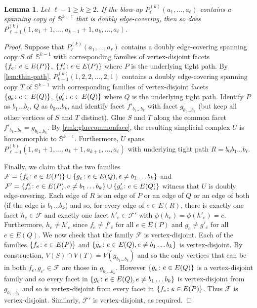 \documentclass[12pt,reqno]{amsart}
\theoremstyle{plain}
\newtheorem{lemma}[theorem]{Lemma}
\theoremstyle{definition}
\numberwithin{equation}{section}
\DeclarePairedDelimiter{\set}{\{}{\}}
\renewcommand{\geq}{\geqslant}
\newcommand{\bS}{\mathbb{S}}
\newcommand{\cF}{\mathcal{F}}
\begin{document}
	\begin{lemma}\label{lem:growing-path}
		Let $\ell - 1 \geq k \geq 2$.
		If the blow-up  $P_\ell^{(k)}(a_1, \dotsc, a_\ell)$ contains a spanning copy of~$\bS^{k - 1}$ that is doubly edge-covering, then so does $P_{\ell + 1}^{(k)}(1, a_1 + 1, \dotsc, a_{k - 1} + 1, a_k, \dotsc, a_\ell)$.
	\end{lemma}
	\begin{proof}
		Suppose that $P_\ell^{(k)}(a_1, \dotsc, a_\ell)$ contains a doubly edge-covering spanning copy $S$ of~$\bS^{k - 1}$ with corresponding families of vertex-disjoint facets $\set{f_e \colon e \in E(P)}$, $\set{f'_e \colon e \in E(P)}$ where $P$ is the underlying tight path. By \cref{lem:thin-path}, $P_{k + 1}^{(k)}(1, 2, 2, \dotsc, 2, 1)$ contains a doubly edge-covering spanning copy $T$ of $\bS^{k - 1}$ with corresponding families of vertex-disjoint facets $\set{g_e \colon e \in E(Q)}$, $\set{g'_e \colon e \in E(Q)}$ where $Q$ is the underlying tight path.
		Identify $P$ as $b_1 \dotsc b_\ell$, $Q$ as $b_0 \dotsc b_k$, and identify facet $f'_{b_1 \dotsc b_k}$ with facet $g_{b_1 \dotsc b_k}$ (but keep all other vertices of $S$ and $T$ distinct). Glue $S$ and $T$ along the common facet $f'_{b_1 \dotsc b_k} = g_{b_1 \dotsc b_k}$. By \cref{rmk:gluecommonface}, the resulting simplicial complex $U$ is homeomorphic to $\bS^{k - 1}$. Furthermore, $U$ spans $P_{\ell + 1}^{(k)}(1, a_1 + 1, \dotsc, a_k + 1, a_{k + 1}, \dotsc, a_\ell)$ with underlying tight path $R = b_0 b_1 \dotsc b_\ell$.
		
		Finally, we claim that the two families $\cF = \set{f_e \colon e \in E(P)} \cup \set{g_e \colon e \in E(Q), e \neq b_1 \dotsc b_k}$ and $\cF' = \set{f'_e \colon e \in E(P), e \neq b_1 \dotsc b_k} \cup \set{g'_e \colon e \in E(Q)}$ witness that $U$ is doubly edge-covering. Each edge of $R$ is an edge of $P$ or an edge of $Q$ or an edge of both (if the edge is $b_1 \dotsc b_k$) and so, for every edge of $e \in E(R)$, there is exactly one facet $h_e \in \cF$ and exactly one facet $h'_e \in \cF'$ with $\phi(h_e) = \phi(h'_e) = e$. Furthermore, $h_e \neq h'_e$ since $f_e \neq f'_e$ for all $e \in E(P)$ and $g_e \neq g'_e$ for all $e \in E(Q)$. We now check that the family $\cF$ is vertex-disjoint. Each of the families $\set{f_e \colon e \in E(P)}$ and $\set{g_e \colon e \in E(Q), e \neq b_1 \dotsc b_k}$ is vertex-disjoint. By construction, $V(S) \cap V(T) = V(g_{b_1 \dotsc b_k})$ and so the only vertices that can be in both $f_e, g_{e'} \in \cF$ are those in $g_{b_1 \dotsc b_k}$. However $\set{g_e \colon e \in E(Q)}$ is a vertex-disjoint family and so every facet in $\set{g_e \colon e \in E(Q), e \neq b_1 \dotsc b_k}$ is vertex-disjoint from $g_{b_1 \dotsc b_k}$ and so is vertex-disjoint from every facet in $\set{f_e \colon e \in E(P)}$. Thus $\cF$ is vertex-disjoint. Similarly, $\cF'$ is vertex-disjoint, as required.
	\end{proof}
	
\end{document}
